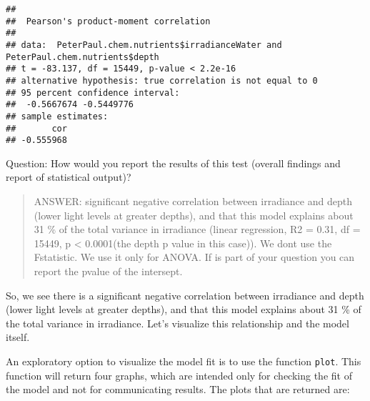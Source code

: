 \documentclass[]{article}
\newenvironment{Shaded}{\begin{snugshade}}{\end{snugshade}}
\newcommand{\KeywordTok}[1]{\textcolor[rgb]{0.13,0.29,0.53}{\textbf{#1}}}
\newcommand{\CommentTok}[1]{\textcolor[rgb]{0.56,0.35,0.01}{\textit{#1}}}
\newcommand{\OperatorTok}[1]{\textcolor[rgb]{0.81,0.36,0.00}{\textbf{#1}}}
\newcommand{\NormalTok}[1]{#1}
\begin{document}
\begin{Shaded}
\end{Shaded}

\begin{verbatim}
## 
##  Pearson's product-moment correlation
## 
## data:  PeterPaul.chem.nutrients$irradianceWater and PeterPaul.chem.nutrients$depth
## t = -83.137, df = 15449, p-value < 2.2e-16
## alternative hypothesis: true correlation is not equal to 0
## 95 percent confidence interval:
##  -0.5667674 -0.5449776
## sample estimates:
##       cor 
## -0.555968
\end{verbatim}

Question: How would you report the results of this test (overall
findings and report of statistical output)?

\begin{quote}
ANSWER: significant negative correlation between irradiance and depth
(lower light levels at greater depths), and that this model explains
about 31 \% of the total variance in irradiance (linear regression, R2 =
0.31, df = 15449, p \textless{} 0.0001(the depth p value in this case)).
We dont use the Fstatistic. We use it only for ANOVA. If is part of your
question you can report the pvalue of the intersept.
\end{quote}

So, we see there is a significant negative correlation between
irradiance and depth (lower light levels at greater depths), and that
this model explains about 31 \% of the total variance in irradiance.
Let's visualize this relationship and the model itself.

An exploratory option to visualize the model fit is to use the function
\texttt{plot}. This function will return four graphs, which are intended
only for checking the fit of the model and not for communicating
results. The plots that are returned are:
\end{document}
